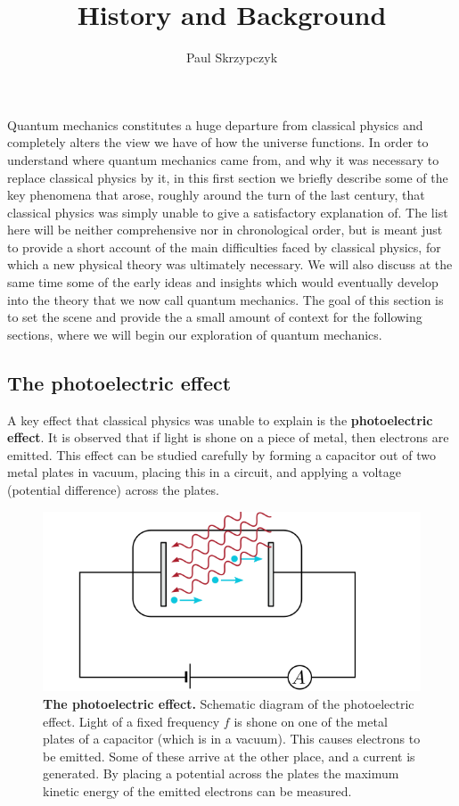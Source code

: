 \documentclass[9pt,Preprint]{lapreprint}
\title{History and Background}
\author[1]{Paul Skrzypczyk}
\affil[1]{School of Physics, University of Bristol}
\begin{document}
\maketitle


Quantum mechanics constitutes a huge departure from classical physics and completely alters the view we have of how the universe functions. In order to understand where quantum mechanics came from, and why it was necessary to replace classical physics by it, in this first section we briefly describe some of the key phenomena that arose, roughly around the turn of the last century, that classical physics was simply unable to give a satisfactory explanation of. The list here will be neither comprehensive nor in chronological order, but is meant just to provide a short account of the main difficulties faced by classical physics, for which a new physical theory was ultimately necessary. We will also discuss at the same time some of the early ideas and insights which would eventually develop into the theory that we now call quantum mechanics. The goal of this section is to set the scene and provide the a small amount of context for the following sections, where we will begin our exploration of quantum mechanics.

\subsection{The photoelectric effect}\label{The photoelectric effect}

A key effect that classical physics was unable to explain is the \textbf{photoelectric effect}. It is observed that if light is shone on a piece of metal, then electrons are emitted. This effect can be studied carefully by forming a capacitor out of two metal plates in vacuum, placing this in a circuit, and applying a voltage (potential difference) across the plates.

\begin{figure}[!htbp]
\centering
\includegraphics[width=0.625\linewidth]{files/photoelectric-825d7eb67bd367836564ff4360164029.svg}
\caption[]{\textbf{The photoelectric effect.} Schematic diagram of the photoelectric effect. Light of a fixed frequency $f$ is shone on one of the metal plates of a capacitor (which is in a vacuum). This causes electrons to be emitted. Some of these arrive at the other place, and a current is generated. By placing a potential across the plates the maximum kinetic energy of the emitted electrons can be measured.}
\label{photoelectric}
\end{figure}
\end{document}

